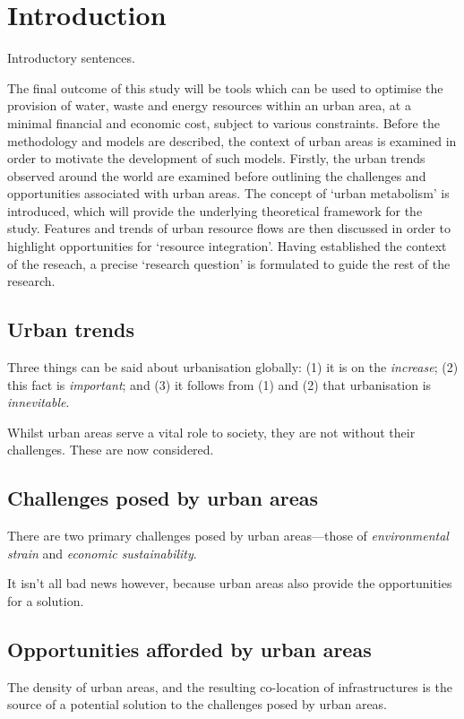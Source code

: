 \section{Introduction}
Introductory sentences.

The final outcome of this study will be tools which can be used to optimise the provision of water, waste and energy resources within an urban area, at a minimal financial and economic cost, subject to various constraints. Before the methodology and models are described, the context of urban areas is examined in order to motivate the development of such models. Firstly, the urban trends observed around the world are examined before outlining the challenges and opportunities associated with urban areas. The concept of `urban metabolism' is introduced, which will provide the underlying theoretical framework for the study. Features and trends of urban resource flows are then discussed in order to highlight opportunities for `resource integration'. Having established the context of the reseach, a precise `research question' is formulated to guide the rest of the research.

\subsection{Urban trends}
Three things can be said about urbanisation globally: (1) it is on the \emph{increase}; (2) this fact is \emph{important}; and (3) it follows from (1) and (2) that urbanisation is \emph{innevitable}.

Whilst urban areas serve a vital role to society, they are not without their challenges. These are now considered.

\subsection{Challenges posed by urban areas}
There are two primary challenges posed by urban areas---those of \emph{environmental strain} and \emph{economic sustainability}.

It isn't all bad news however, because urban areas also provide the opportunities for a solution.

\subsection{Opportunities afforded by urban areas}
The density of urban areas, and the resulting co-location of infrastructures is the source of a potential solution to the challenges posed by urban areas.

